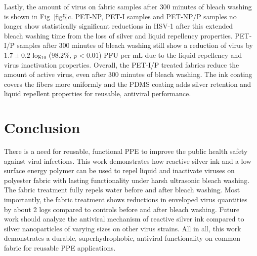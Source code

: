 \documentclass[10pt,letterpaper]{article}
\begin{document}

Lastly, the amount of virus on fabric samples after 300 minutes of bleach washing is shown in Fig~\ref{fig5}c. PET-NP, PET-I samples and PET-NP/P samples no longer show statistically significant reductions in HSV-1 after this extended bleach washing time from the loss of silver and liquid repellency properties. PET-I/P samples after 300 minutes of bleach washing still show a reduction of virus by $1.7 \pm 0.2$ log$_{10}$ ($98.2 %
\%$, $p < 0.01$) PFU per mL due to the liquid repellency and virus inactivation properties. %
Overall, the PET-I/P treated fabrics reduce the amount of active virus, even after 300 minutes of bleach washing. The ink coating covers the fibers more uniformly and the PDMS coating adds silver retention and liquid repellent properties for reusable, antiviral performance.


\section*{Conclusion}
There is a need for reusable, functional PPE to improve the public health safety against viral infections. This work demonstrates how reactive %
silver ink and a low surface energy polymer can be used to repel liquid and inactivate viruses on polyester fabric with lasting functionality under harsh ultrasonic bleach washing. The fabric treatment fully repels water before and after bleach washing. Most importantly, the fabric treatment shows reductions in enveloped virus quantities by about 2 logs compared to controls before and after bleach washing. Future work should analyze the antiviral mechanism of reactive silver ink compared to silver nanoparticles of varying sizes on other virus strains. %
All in all, this work demonstrates a durable, superhydrophobic, antiviral functionality on common fabric for reusable PPE applications.
\end{document}
